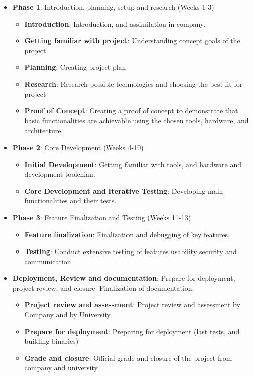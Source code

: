 \documentclass[a4paper, 11pt]{article}
\begin{document}
  \begin{itemize}
    \item \textbf{Phase 1}: Introduction, planning, setup and research (Weeks 1-3)
    \begin{itemize}
      \item \textbf{Introduction}: Introduction, and assimilation in company.
      \item \textbf{Getting familiar with project}: Understanding concept goals of the project
      \item \textbf{Planning}: Creating project plan
      \item \textbf{Research}: Research possible technologies and choosing the best fit for project
      \item \textbf{Proof of Concept}: Creating a proof of concept to demonstrate that basic functionalities are achievable using the chosen tools, hardware, and architecture.
    \end{itemize}
    \item\textbf{Phase 2}: Core Development (Weeks 4-10)
    \begin{itemize}
      \item \textbf{Initial Development}: Getting familiar with tools, and hardware and development toolchian.
      \item \textbf{Core Development and Iterative Testing}: Developing main functionalities and their tests.
    \end{itemize}
    \item \textbf{Phase 3}: Feature Finalization and Testing (Weeks 11-13)
    \begin{itemize}
      \item \textbf{Feature finalization}: Finalization and debugging of key features.
      \item \textbf{Testing}: Conduct extensive testing of features usability security and communication.
    \end{itemize}
    \item \textbf{Deployment, Review and documentation}: Prepare for deployment, project review, and closure. Finalization of documentation.
    \begin{itemize}
      \item \textbf{Project review and assessment}: Project review and assessment by Company and by University
      \item \textbf{Prepare for deployment}: Preparing for deployment (last tests, and building binaries)
      \item \textbf{Grade and closure}: Official grade and closure of the project from company and university
    \end{itemize}
  \end{itemize}
\end{document}
